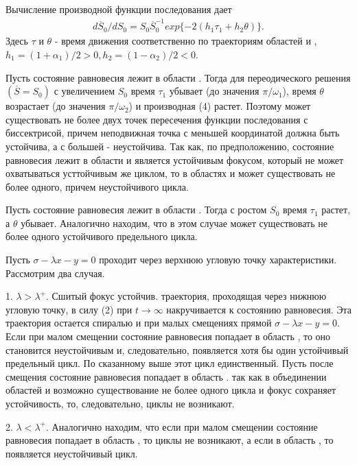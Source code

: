 \documentclass{article}
\newcommand{\RomanNumeralCaps}[1]
    {\MakeUppercase{\romannumeral #1}}
\begin{document}
Вычисление производной функции последования дает
\begin{gather}
d\overline{S}_{0}/dS_{0} = S_{0}\overline{S}_{0}^{-1} exp\{-2(h_{1} \tau_{1} + h_{2} \theta)\}.
\tag{4}
\end{gather}
Здесь $\tau$ и $\theta$ - время движения соответственно по траекториям
областей \RomanNumeralCaps{1} и \RomanNumeralCaps{2}, $h_{1}=(1 + \alpha_{1})/2 > 0, h_{2}=(1 - \alpha_{2})/2 < 0$.

Пусть состояние равновесия лежит в области \RomanNumeralCaps{1}. Тогда для переодического 
решения $(\overline{S}=S_{0})$ с увеличением $S_{0}$ время $\tau_{1}$ убывает
(до значения $\pi / \omega_{1}$), время $\theta$ возрастает (до значения $\pi / \omega_{2}$)
и производная (4) растет. Поэтому может существовать не более 
двух точек пересечения функции последования с биссектрисой,
причем неподвижная точка с меньшей координатой должна быть
устойчива, а с большей - неустойчива. Так как, по предположению,
состояние равновесия лежит в области \RomanNumeralCaps{1} и является устойчивым фокусом, который не может охватываться усттойчивым же
циклом, то в областях \RomanNumeralCaps{1} и \RomanNumeralCaps{2} может существовать не более одного,
причем неустойчивого цикла.

Пусть состояние равновесия лежит в области \RomanNumeralCaps{2}. Тогда с ростом
$S_{0}$ время $\tau_{1}$ растет, а $\theta$ убывает. Аналогично находим, что
в этом случае может существовать не более одного устойчивого 
предельного цикла.

Пусть $\sigma - \lambda x - y = 0$ проходит через верхнюю угловую точку
характеристики. Рассмотрим два случая.

1. $\lambda > \lambda^+$. Сшитый фокус устойчив. траектория, проходящая 
через нижнюю угловую точку, в силу (2) при $t \rightarrow \infty$ накручивается
к состоянию равновесия. Эта траектория остается спиралью
и при малых смещениях прямой $\sigma - \lambda x - y = 0$. Если при
малом смещении состояние равновесия попадает в область \RomanNumeralCaps{2}, то
оно становится неустойчивым и, следовательно, появляется хотя
бы один устойчивый предельный цикл. По сказанному выше этот
цикл единственный. Пусть после смещения состояние равновесия
попадает в область \RomanNumeralCaps{1}. так как в объединении областей \RomanNumeralCaps{1} и \RomanNumeralCaps{2} возможно
существование не более одного цикла и фокус сохраняет
устойчивость, то, следовательно, циклы не возникают.

2. $\lambda < \lambda^+$. Аналогично находим, что если при малом смещении
состояние равновесия попадает в область \RomanNumeralCaps{2}, то циклы не возникают, 
а если в область \RomanNumeralCaps{1}, то появляется неустойчивый цикл.
\end{document}
